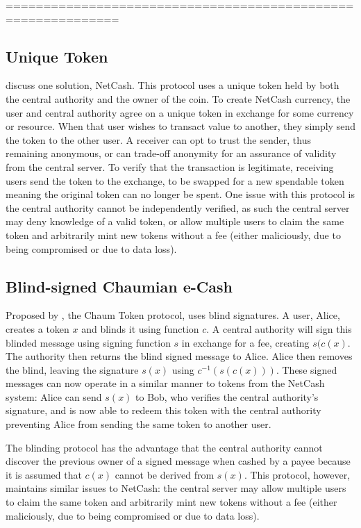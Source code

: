 =============================================================

\subsection{Unique Token}
\textcite{netcash} discuss one solution, NetCash.  This protocol uses a unique token held by both the central authority and the owner of the coin. To create NetCash currency, the user and central authority agree on a unique token in exchange for some currency or resource. When that user wishes to transact value to another, they simply send the token to the other user.  A receiver can opt to trust the sender, thus remaining anonymous, or can trade-off anonymity for an assurance of validity from the central server.  To verify that the transaction is legitimate, receiving users send the token to the exchange, to be swapped for a new spendable token meaning the original token can no longer be spent. One issue with this protocol is the central authority cannot be independently verified, as such the central server may deny knowledge of a valid token, or allow multiple users to claim the same token and arbitrarily mint new tokens without a fee (either maliciously, due to being compromised or due to data loss).

\subsection{Blind-signed Chaumian e-Cash}
Proposed by \textcite{chaum}, the Chaum Token protocol, uses blind signatures. A user, Alice, creates a token $x$ and blinds it using function $c$.  A central authority will sign this blinded message using signing function $s$ in exchange for a fee, creating $s(c(x)$.  The authority then returns the blind signed message to Alice. Alice then removes the blind, leaving the signature $s(x)$ using $c^{-1}(s(c(x)))$.  These signed messages can now operate in a similar manner to tokens from the NetCash system: Alice can send $s(x)$ to Bob, who verifies the central authority's signature, and is now able to redeem this token with the central authority preventing Alice from sending the same token to another user.

The blinding protocol has the advantage that the central authority cannot discover the previous owner of a signed message when cashed by a payee because it is assumed that $c(x)$ cannot be derived from $s(x)$.  This protocol, however, maintains similar issues to NetCash: the central server may allow multiple users to claim the same token and arbitrarily mint new tokens without a fee (either maliciously, due to being compromised or due to data loss).

